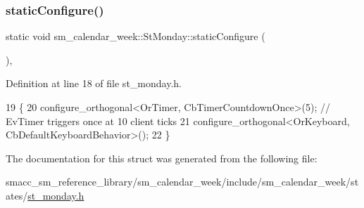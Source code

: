 \subsubsection{\texorpdfstring{static\+Configure()}{staticConfigure()}}
{\footnotesize\ttfamily static void sm\+\_\+calendar\+\_\+week\+::\+St\+Monday\+::static\+Configure (\begin{DoxyParamCaption}{ }\end{DoxyParamCaption})\hspace{0.3cm}{\ttfamily [inline]}, {\ttfamily [static]}}



Definition at line 18 of file st\+\_\+monday.\+h.


\begin{DoxyCode}
19     \{
20         configure\_orthogonal<OrTimer, CbTimerCountdownOnce>(5); \textcolor{comment}{// EvTimer triggers once at 10 client ticks}
21         configure\_orthogonal<OrKeyboard, CbDefaultKeyboardBehavior>();
22     \}
\end{DoxyCode}


The documentation for this struct was generated from the following file\+:\begin{DoxyCompactItemize}
\item 
smacc\+\_\+sm\+\_\+reference\+\_\+library/sm\+\_\+calendar\+\_\+week/include/sm\+\_\+calendar\+\_\+week/states/\hyperlink{st__monday_8h}{st\+\_\+monday.\+h}\end{DoxyCompactItemize}
